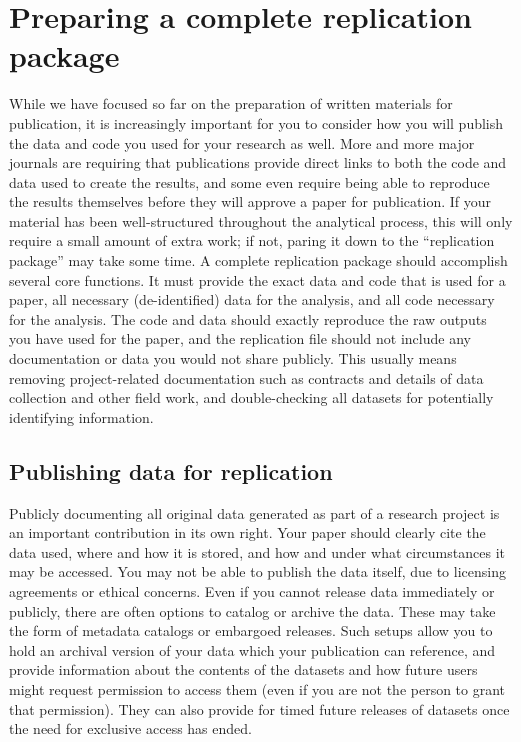 
\section{Preparing a complete replication package}

While we have focused so far on the preparation of written materials for publication,
it is increasingly important for you to consider how you will publish
the data and code you used for your research as well.
More and more major journals are requiring that publications
provide direct links to both the code and data used to create the results,
and some even require being able to reproduce the results themselves
before they will approve a paper for publication.
If your material has been well-structured throughout the analytical process,
this will only require a small amount of extra work;
if not, paring it down to the ``replication package'' may take some time.
A complete replication package should accomplish several core functions.
It must provide the exact data and code that is used for a paper,
all necessary (de-identified) data for the analysis,
and all code necessary for the analysis.
The code and data should exactly reproduce the raw outputs you have used for the paper,
and the replication file should not include any documentation or data you would not share publicly.
This usually means removing project-related documentation such as contracts
and details of data collection and other field work,
and double-checking all datasets for potentially identifying information.

\subsection{Publishing data for replication}

Publicly documenting all original data generated as part of a research project 
is an important contribution in its own right.
Your paper should clearly cite the data used,
where and how it is stored, and how and under what circumstances it may be accessed.
You may not be able to publish the data itself, 
due to licensing agreements or ethical concerns.
Even if you cannot release data immediately or publicly,
there are often options to catalog or archive the data.
These may take the form of metadata catalogs or embargoed releases.
Such setups allow you to hold an archival version of your data
which your publication can reference,
and provide information about the contents of the datasets
and how future users might request permission to access them
(even if you are not the person to grant that permission).
They can also provide for timed future releases of datasets
once the need for exclusive access has ended.


